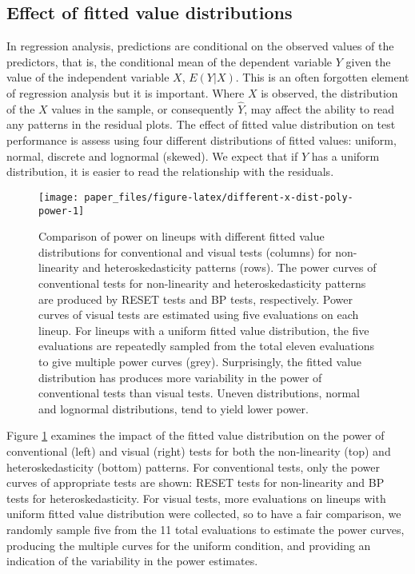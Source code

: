 \documentclass[]{interact}
\theoremstyle{plain}%
\theoremstyle{definition}
\theoremstyle{remark}
\begin{document}
\hypertarget{effect-of-fitted-value-distributions}{%
\subsection{Effect of fitted value
distributions}\label{effect-of-fitted-value-distributions}}

In regression analysis, predictions are conditional on the observed
values of the predictors, that is, the conditional mean of the dependent
variable \(Y\) given the value of the independent variable \(X\),
\(E(Y|X)\). This is an often forgotten element of regression analysis
but it is important. Where \(X\) is observed, the distribution of the
\(X\) values in the sample, or consequently \(\hat{Y}\), may affect the
ability to read any patterns in the residual plots. The effect of fitted
value distribution on test performance is assess using four different
distributions of fitted values: uniform, normal, discrete and lognormal
(skewed). We expect that if \(\hat{Y}\) has a uniform distribution, it
is easier to read the relationship with the residuals.

\begin{figure}[t!]

{\centering \texttt{[image: paper\_files/figure-latex/different-x-dist-poly-power-1]} 

}

\caption{Comparison of power on lineups with different fitted value distributions for conventional and visual tests (columns) for non-linearity and heteroskedasticity patterns (rows). The power curves of conventional tests for non-linearity and heteroskedasticity patterns are produced by RESET tests and BP tests, respectively. Power curves of visual tests are estimated using five evaluations on each lineup. For lineups with a uniform fitted value distribution, the five evaluations are repeatedly sampled from the total eleven evaluations to give multiple power curves (grey). Surprisingly, the fitted value distribution has produces more variability in the power of conventional tests than visual tests. Uneven distributions, normal and lognormal distributions, tend to yield lower power.}\label{fig:different-x-dist-poly-power}
\end{figure}

Figure \ref{fig:different-x-dist-poly-power} examines the impact of the
fitted value distribution on the power of conventional (left) and visual
(right) tests for both the non-linearity (top) and heteroskedasticity
(bottom) patterns. For conventional tests, only the power curves of
appropriate tests are shown: RESET tests for non-linearity and BP tests
for heteroskedasticity. For visual tests, more evaluations on lineups
with uniform fitted value distribution were collected, so to have a fair
comparison, we randomly sample five from the 11 total evaluations to
estimate the power curves, producing the multiple curves for the uniform
condition, and providing an indication of the variability in the power
estimates.
\end{document}
